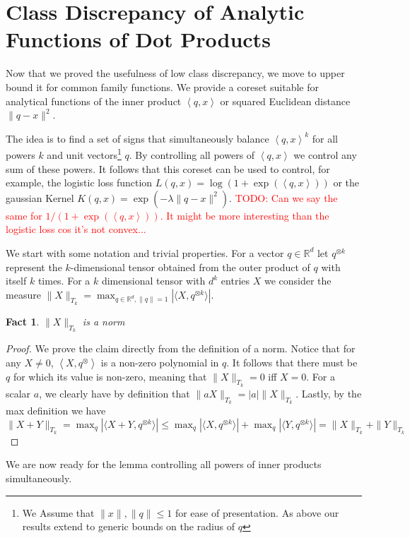 \documentclass[anon,12pt]{colt2019} %
\newtheorem{fact}[theorem]{Fact}
\newcommand{\todo}[1]{\textcolor{red}{TODO: #1}}
\newcommand{\ip}[1]{\left \langle #1 \right \rangle}
\newcommand{\R}{\mathbb{R}}
\begin{document}
\section{Class Discrepancy of Analytic Functions of Dot Products} \label{sec:analytic}

Now that we proved the usefulness of low class discrepancy, we move to upper bound it for common family functions. We provide a coreset suitable for analytical functions of the inner product $\ip{q,x}$ or squared Euclidean distance $\|q-x\|^2$. 

The idea is to find a set of signs that simultaneously balance $\ip{q,x}^k$ for all powers $k$ and unit vectors\footnote{We Assume that $\|x\|,\|q\| \leq 1$ for ease of presentation. As above our results extend to generic bounds on the radius of $q$} $q$. By controlling all powers of $\ip{q,x}$ we control any sum of these powers. It follows that this coreset can be used to control, for example, the logistic loss function $L(q,x) = \log(1+\exp(\ip{q,x}))$ or the gaussian Kernel $K(q,x) = \exp(-\lambda \|q-x\|^2)$. \todo{Can we say the same for $1/(1 + \exp(\ip{q,x}))$. It might be more interesting than the logistic loss cos it's not convex...}


We start with some notation and trivial properties. 
For a vector $q \in \R^d$ let $q^{\otimes k}$ represent the $k$-dimensional tensor obtained from the outer product of $q$ with itself $k$ times. For a $k$ dimensional tensor with $d^k$ entries $X$ we consider the measure
$\|X\|_{T_k} = \max_{q \in \R^d, \|q\|=1} \left| \langle X, q^{\otimes k}\rangle \right|$.
\begin{fact}
$\|X\|_{T_k}$ is a norm
\end{fact}
\begin{proof}
We prove the claim directly from the definition of a norm.
Notice that for any $X \neq 0$, $\ip{X, q^{\otimes}}$ is a non-zero polynomial in $q$. It follows that there must be $q$ for which its value is non-zero, meaning that $\|X\|_{T_k}=0$ iff $X=0$. For a scalar $a$, we clearly have by definition that
$\|aX\|_{T_k} = |a|\|X\|_{T_k}$.  Lastly, by the max definition we  have
$ \|X+Y\|_{T_k} =  \max_q \left| \langle X+Y, q^{\otimes k}\rangle \right| \leq 
\max_q \left| \langle X, q^{\otimes k}\rangle \right| + \max_q\left| \langle Y, q^{\otimes k}\rangle \right| = \|X\|_{T_k} + \|Y\|_{T_k}$
\end{proof}

We are now ready for the lemma controlling all powers of inner products simultaneously. 
\end{document}
